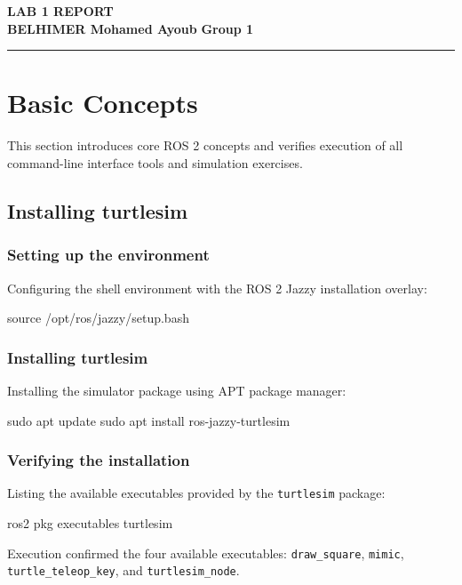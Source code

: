 \documentclass[11pt,a4paper]{article}
\begin{document}
\begin{center}
  {\LARGE \textbf{\color{primary}LAB 1 REPORT}}\\[0.25cm]
  {\large \textbf{BELHIMER Mohamed Ayoub} \quad \textbullet \quad \textbf{Group 1}}\\[0.25cm]
  \rule{\linewidth}{0.8pt}
\end{center}
\vspace{-0.1cm}

\setcounter{section}{2}

\section{Basic Concepts}
This section introduces core ROS 2 concepts and verifies execution of all command-line interface tools and simulation exercises.

\subsection{Installing turtlesim}

\subsubsection{Setting up the environment}
Configuring the shell environment with the ROS 2 Jazzy installation overlay:
\begin{cmdbox}
source /opt/ros/jazzy/setup.bash
\end{cmdbox}

\subsubsection{Installing turtlesim}
Installing the simulator package using APT package manager:
\begin{cmdbox}
sudo apt update
sudo apt install ros-jazzy-turtlesim
\end{cmdbox}

\subsubsection{Verifying the installation}
Listing the available executables provided by the \texttt{turtlesim} package:
\begin{cmdbox}
ros2 pkg executables turtlesim
\end{cmdbox}
Execution confirmed the four available executables: \texttt{draw\_square}, \texttt{mimic}, \texttt{turtle\_teleop\_key}, and \texttt{turtlesim\_node}.
\end{document}
